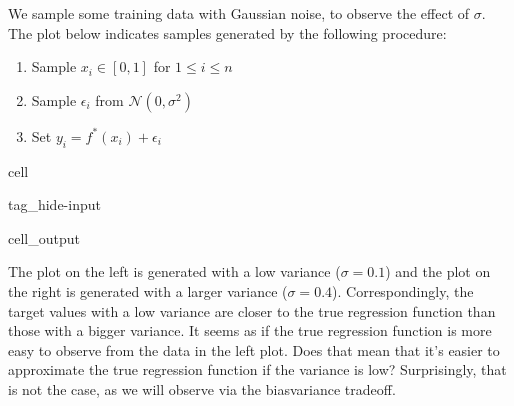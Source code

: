 \documentclass[letterpaper,10pt,english]{jupyterBook}
\begin{document}
\sphinxAtStartPar
We sample some training data with Gaussian noise, to observe the effect of \(\sigma\).
The plot below indicates samples generated by the following procedure:
\begin{enumerate}
%
\item {} 
\sphinxAtStartPar
Sample \(x_{i}\in[0,1]\) for \(1\leq i \leq n\)

\item {} 
\sphinxAtStartPar
Sample \(\epsilon_i\) from \(\mathcal{N}(0,\sigma^2)\)

\item {} 
\sphinxAtStartPar
Set \(y_i=f^*(x_{i})+\epsilon_i\)

\end{enumerate}

\begin{sphinxuseclass}{cell}
\begin{sphinxuseclass}{tag_hide-input}\begin{sphinxVerbatimOutput}

\begin{sphinxuseclass}{cell_output}
\noindent{}

\end{sphinxuseclass}\end{sphinxVerbatimOutput}

\end{sphinxuseclass}
\end{sphinxuseclass}
\sphinxAtStartPar
The plot on the left is generated with a low variance (\(\sigma=0.1\)) and the plot on the right is generated with a larger variance (\(\sigma=0.4\)). Correspondingly, the target values with a low variance are closer to the true regression function than those with a bigger variance. It seems as if the true regression function is more easy to observe from the data in the left plot. Does that mean that it’s easier to approximate the true regression function if the variance is low? Surprisingly, that is not the case, as we will observe via the bias\sphinxhyphen{}variance trade\sphinxhyphen{}off.
\end{document}
